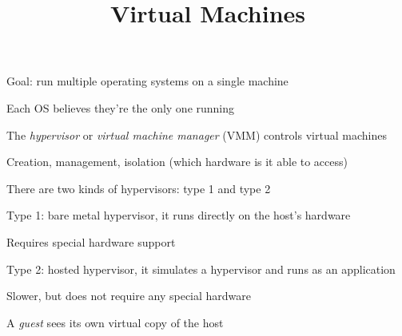 

\title{Virtual Machines}



  \begin{frame}
    \titlepage
  \end{frame}

  \begin{slide}
    

    Goal: run multiple operating systems on a single machine

    \leftspace{}Each OS believes they're the only one running

  \end{slide}

  \begin{slide}
    

    The \textit{hypervisor} or \textit{virtual machine manager} (VMM) controls
    virtual machines

    \leftspace{}Creation, management, isolation (which hardware is it able to
    access)
    \medskip

    There are two kinds of hypervisors: type 1 and type 2

    \leftspace{}Type 1: bare metal hypervisor, it runs directly on the host's
    hardware

    \leftspace{}\leftspace{}Requires special hardware support

    \leftspace{}Type 2: hosted hypervisor, it simulates a hypervisor and runs
                 as an application

    \leftspace{}\leftspace{}Slower, but does not require any special hardware
    \medskip

    A \textit{guest} sees its own virtual copy of the host

  \end{slide}

